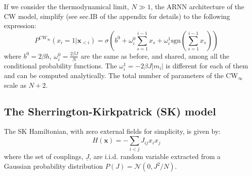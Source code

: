 \documentclass[aps,physrev,10pt,floatfix,reprint]{revtex4-2}
\begin{document}
If we consider the thermodynamical limit, $N \gg 1$, the ARNN architecture of the CW model, simplify (see sec.IB of the appendix for details) to the following expression:
\begin{equation}
    \label{eq:curie_weiss_cond2}
    P^{CW_{\infty}}\left(x_{i}=1|\mathbf{x}_{<i}\right) =  \sigma \left(b^0+\omega_{i}^0\sum_{s=1}^{i-1}x_{s} + \omega_i^1 \text{sgn}(\sum_{s=1}^{i-1}x_{s})\right)
\end{equation}
where $b^0=2\beta h$, $\omega^0_i = \frac{2\beta J}{N}$ are the same as before, and shared, among all the conditional probability functions. The $\omega^1_i = -2\beta J |m_i|$ is different for each of them and can be computed analytically. 
The total number of parameters of the CW$_{\infty}$ scale as $N+2$.
    

\subsection{The Sherrington-Kirkpatrick (SK) model}
\label{sec:SK}
The SK Hamiltonian, with zero external fields for simplicity, is given by:
\begin{equation}
H\left(\mathbf{x}\right)=-\sum_{i<j}J_{ij}x_{i}x_{j}
\end{equation}
where the set of couplings, $\underline{J}$, are i.i.d. random variable extracted from a Gaussian probability distribution $P(J)= \mathcal{N}(0, J^2/N)$. 
\end{document}
